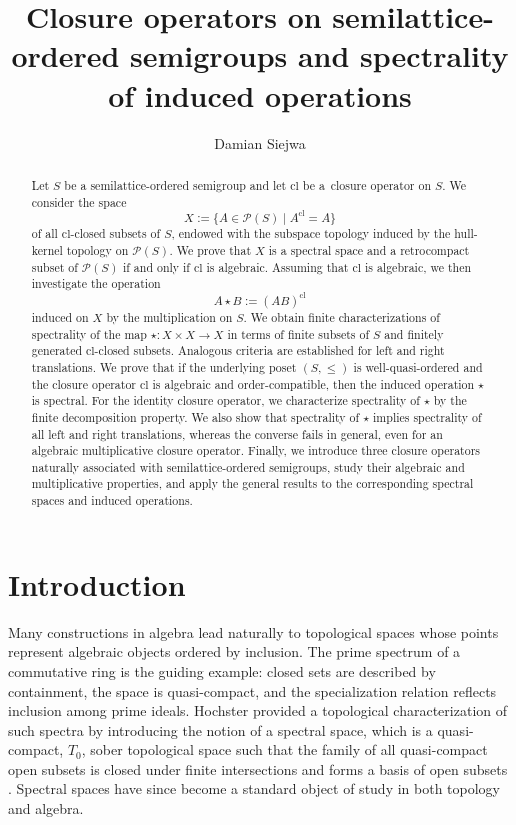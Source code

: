 \documentclass[10pt, reqno]{amsart}
\title[Spectrality of induced operations]{Closure operators on semilattice-ordered semigroups and spectrality of induced operations}
\author[D. Siejwa]{Damian Siejwa}
\theoremstyle{plain}
\theoremstyle{definition}
\begin{document}
\begin{abstract}
    Let $S$ be a semilattice-ordered semigroup and let $\mathrm{cl}$ be a~closure operator on $S$. We consider the space $$X := \{A \in \mathcal{P}(S) \mid A^\mathrm{cl} = A\}$$ of all $\mathrm{cl}$-closed subsets of $S$, endowed with the subspace topology induced by the hull-kernel topology on $\mathcal{P}(S)$. We prove that $X$ is a spectral space and a retrocompact subset of $\mathcal{P}(S)$ if and only if $\mathrm{cl}$ is algebraic. Assuming that $\mathrm{cl}$ is algebraic, we then investigate the operation $$A \star B := (AB)^\mathrm{cl}$$ induced on $X$ by the multiplication on $S$. We obtain finite characterizations of spectrality of the map $\star: X \times X \to X$ in terms of finite subsets of $S$ and finitely generated $\mathrm{cl}$-closed subsets. Analogous criteria are established for left and right translations. We prove that if the underlying poset $(S, \leqslant)$ is well-quasi-ordered and the closure operator $\mathrm{cl}$ is algebraic and order-compatible, then the induced operation $\star$ is spectral. For the identity closure operator, we characterize spectrality of $\star$ by the finite decomposition property. We also show that spectrality of $\star$ implies spectrality of all left and right translations, whereas the converse fails in general, even for an algebraic multiplicative closure operator. Finally, we introduce three closure operators naturally associated with semilattice-ordered semigroups, study their algebraic and multiplicative properties, and apply the general results to the corresponding spectral spaces and induced operations.  
\end{abstract}
\maketitle
\section{Introduction}
Many constructions in algebra lead naturally to topological spaces whose points represent algebraic objects ordered by inclusion. The prime spectrum of a commutative ring is the guiding example: closed sets are described by containment, the space is quasi-compact, and the specialization relation reflects inclusion among prime ideals. Hochster provided a topological characterization of such spectra by introducing the notion of a spectral space, which is a quasi-compact, $T_0$, sober topological space such that the family of all quasi-compact open subsets is closed under finite intersections and forms a basis of open subsets \cite{Hochster}. Spectral spaces have since become a standard object of study in both topology and algebra. 
\end{document}
